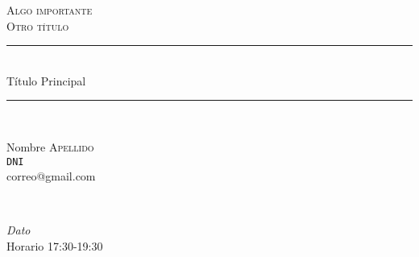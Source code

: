 \begin{titlepage}

\newcommand{\HRule}{\rule{\linewidth}{0.7mm}}

\center 
 

\textsc{\Huge Algo importante}\\[2.5cm] 
\textsc{\LARGE Otro título}\\[3cm]



\HRule \\[1cm]
{\fontsize{55}{60}\selectfont \sffamily Título Principal}\\[0.6cm] 
\HRule \\[8.2cm]
 


\begin{minipage}{0.4\textwidth}
\begin{flushleft} \large
Nombre \textsc{Apellido}\\ %
\texttt{DNI}\\
correo@gmail.com
\end{flushleft}
\end{minipage}
~
\begin{minipage}{0.4\textwidth}
\begin{flushright} \large
\emph{Dato} \\
Horario 17:30-19:30
\end{flushright}
\end{minipage}\\[4cm]


\end{titlepage}